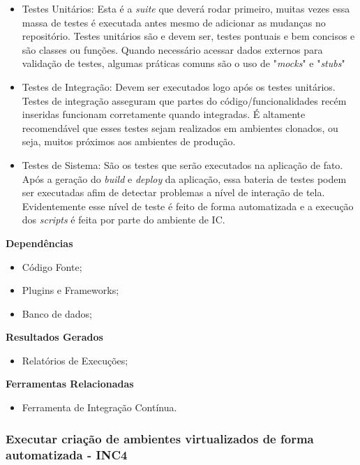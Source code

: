 \begin{itemize}
	\item Testes Unitários: Esta é a \textit{suite} que deverá rodar primeiro, muitas vezes essa massa de testes é executada antes mesmo de adicionar as mudanças no repositório. Testes unitários são e devem ser, testes pontuais e bem concisos e são classes ou funções. Quando necessário acessar dados externos para validação de testes, algumas práticas comuns são o uso de "\textit{mocks}" e "\textit{stubs}"
	\item Testes de Integração: Devem ser executados logo após os testes unitários. Testes de integração asseguram que partes do código/funcionalidades recém inseridas funcionam corretamente quando integradas. É altamente recomendável que esses testes sejam realizados em ambientes clonados, ou seja, muitos próximos aos ambientes de produção.
	\item Testes de Sistema: São os testes que serão executados na aplicação de fato. Após a geração do \textit{build} e \textit{deploy} da aplicação, essa bateria de testes podem ser executadas afim de detectar problemas a nível de interação de tela. Evidentemente esse nível de teste é feito de forma automatizada e a execução dos \textit{scripts} é feita por parte do ambiente de IC.
\end{itemize}

\textbf{Dependências}
\begin{itemize}
    \item Código Fonte;
    \item Plugins e Frameworks;
    \item Banco de dados;
\end{itemize}

\textbf{ Resultados Gerados}
\begin{itemize}
    \item Relatórios de Execuções;
\end{itemize}

\textbf{ Ferramentas Relacionadas}
\begin{itemize}
    \item Ferramenta de Integração Contínua.
\end{itemize}

\subsubsection{Executar criação de ambientes virtualizados de forma automatizada - INC4}
\label{sec:inc4}

